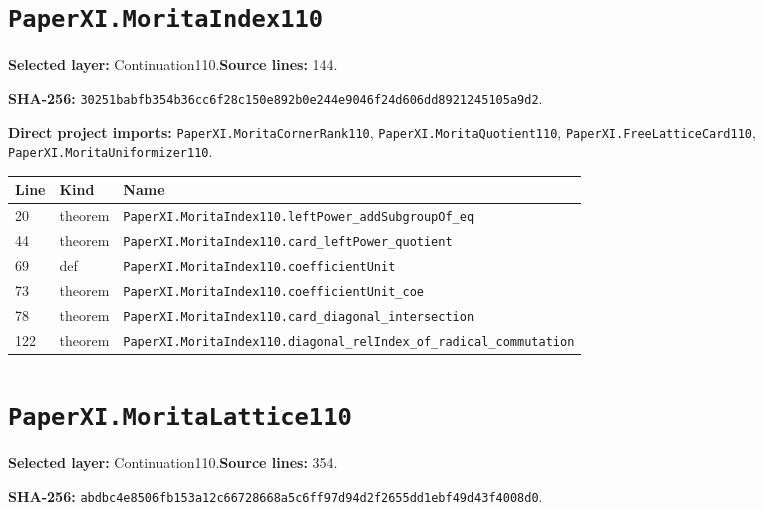 \documentclass[10pt,oneside]{book}
\begin{document}
\section{\texorpdfstring{\nolinkurl{PaperXI.MoritaIndex110}}{PaperXI.MoritaIndex110}}\label{module:PaperXI.MoritaIndex110}

\textbf{Selected layer:} Continuation110.\quad\textbf{Source lines:} 144.\par\textbf{SHA-256:} {\scriptsize\nolinkurl{30251babfb354b36cc6f28c150e892b0e244e9046f24d606dd8921245105a9d2}}.


\textbf{Direct project imports:} \nolinkurl{PaperXI.MoritaCornerRank110}, \nolinkurl{PaperXI.MoritaQuotient110}, \nolinkurl{PaperXI.FreeLatticeCard110}, \nolinkurl{PaperXI.MoritaUniformizer110}.

\begin{longtable}{@{}p{}p{}p{}@{}}\toprule Line&Kind&Name\\\midrule\endhead

20&theorem&\nolinkurl{PaperXI.MoritaIndex110.leftPower_addSubgroupOf_eq}\\

44&theorem&\nolinkurl{PaperXI.MoritaIndex110.card_leftPower_quotient}\\

69&def&\nolinkurl{PaperXI.MoritaIndex110.coefficientUnit}\\

73&theorem&\nolinkurl{PaperXI.MoritaIndex110.coefficientUnit_coe}\\

78&theorem&\nolinkurl{PaperXI.MoritaIndex110.card_diagonal_intersection}\\

122&theorem&\nolinkurl{PaperXI.MoritaIndex110.diagonal_relIndex_of_radical_commutation}\\

\bottomrule\end{longtable}

\section{\texorpdfstring{\nolinkurl{PaperXI.MoritaLattice110}}{PaperXI.MoritaLattice110}}\label{module:PaperXI.MoritaLattice110}

\textbf{Selected layer:} Continuation110.\quad\textbf{Source lines:} 354.\par\textbf{SHA-256:} {\scriptsize\nolinkurl{abdbc4e8506fb153a12c66728668a5c6ff97d94d2f2655dd1ebf49d43f4008d0}}.
\end{document}
